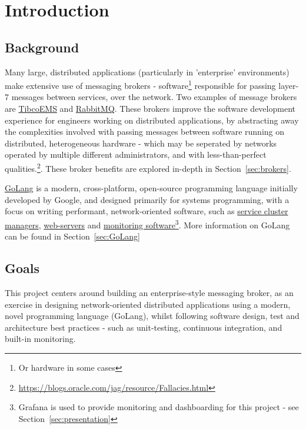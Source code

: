 \chapter{Introduction}
\label{chap:Introduction}

\section{Background}
\label{sec:background}

Many large, distributed applications (particularly in 'enterprise' environments)
make extensive use of messaging brokers - software\footnote{Or hardware in some
cases\cite{solaceappliances}} responsible for passing layer-7 messages between
services, over the network. Two examples of message brokers are
\href{http://www.tibco.com/products/automation/enterprise-messaging/enterprise-message-service}{TibcoEMS}
and \href{https://www.rabbitmq.com/}{RabbitMQ}. These brokers improve the
software development experience for engineers working on distributed
applications, by abstracting away the complexities involved with passing
messages between software running on distributed, heterogeneous hardware - which
may be seperated by networks operated by multiple different administrators, and
with less-than-perfect
qualities.\footnote{\url{https://blogs.oracle.com/jag/resource/Fallacies.html}}. These broker benefits are explored in-depth in Section~\ref{sec:brokers}.

\href{https://golang.org/}{GoLang} is a modern, cross-platform, open-source
programming language initially developed by Google, and designed primarily for
systems programming, with a focus on writing performant, network-oriented
software, such as \href{https://github.com/kubernetes/kubernetes}{service
cluster managers}, \href{https://github.com/mholt/caddy}{web-servers} and
\href{https://github.com/grafana/grafana}{monitoring software}\footnote{Grafana
is used to provide monitoring and dashboarding for this project - see
Section~\ref{sec:presentation}}. More information on GoLang can be found in
Section~\ref{sec:GoLang}

\section{Goals}
This project centers around building an enterprise-style messaging broker,
as an exercise in designing network-oriented distributed applications using a modern, novel programming language (GoLang), whilst following software design, test and architecture best practices - such as unit-testing, continuous integration, and built-in monitoring.

